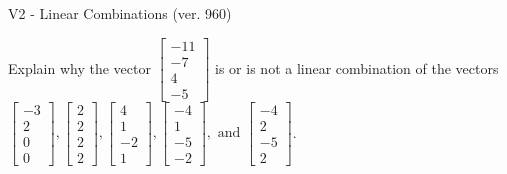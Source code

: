 \begin{exercise}
  \begin{exerciseTitle}V2 - Linear Combinations (ver. 960)\end{exerciseTitle}
  \begin{exerciseStatement}
    Explain why the vector \(\left[\begin{array}{c}
-11 \\
-7 \\
4 \\
-5
\end{array}\right]\)  is or is not a linear 
	combination of the vectors \(\left[\begin{array}{c}
-3 \\
2 \\
0 \\
0
\end{array}\right] , \left[\begin{array}{c}
2 \\
2 \\
2 \\
2
\end{array}\right] , \left[\begin{array}{c}
4 \\
1 \\
-2 \\
1
\end{array}\right] , \left[\begin{array}{c}
-4 \\
1 \\
-5 \\
-2
\end{array}\right] , \text{ and } \left[\begin{array}{c}
-4 \\
2 \\
-5 \\
2
\end{array}\right]\).
	



\end{exerciseStatement}
\end{exercise}
